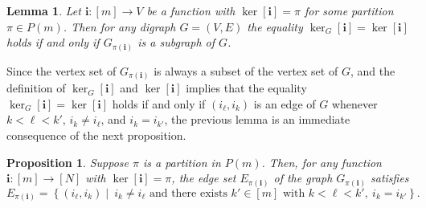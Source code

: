 \documentclass[a4paper,12pt]{extarticle}
\newtheorem{lem}[thm]{Lemma}
\newtheorem{prop}[thm]{Proposition}
\theoremstyle{definition}
\theoremstyle{remark}
\begin{document}
\begin{lem}
 \label{kertopi}
Let $\bm{i}:[m] \to V$ be a function with $\ker[\bm{i}] = \pi$ for some partition $\pi \in P(m)$. 
%
Then for any digraph $G=(V,E)$ the equality $\ker_G[\bm{i}]=\ker[\bm{i}]$ holds if and only if $G_{\pi(\bm{i})}$ is a subgraph of $G$. 
%
\end{lem}


Since the vertex set of $G_{\pi(\bm{i})}$ is always a subset of the vertex set of $G$, and the definition of  $\ker_G[\bm{i}]$ and $\ker[\bm{i}]$ implies that the equality $\ker_G[\bm{i}]=\ker[\bm{i}]$ holds if and only if $(i_\ell,i_k)$ is an edge of $G$ whenever $k < \ell < k'$, $i_k \neq i_\ell$, and $i_k = i_{k'}$, the previous lemma is an immediate consequence of the next proposition. 


\begin{prop}\label{prop_evaluation_nest_cross}
%
Suppose $\pi$ is a partition in $P(m)$.
%
Then, for any function $\bm{i}: [m] \to [N]$ with $\ker[\bm{i}] = \pi$, the edge set $E_{\pi(\bm{i})}$ of the graph $G_{\pi({\bm i})}$ satisfies
%
\[ E_{\pi(\bm{i})} = \left\{ (i_\ell,i_k)  \mid  \ i_k \neq i_\ell \text{ and there exists } k' \in [m] \text{ with }k < \ell < k', \ i_k = i_{k'} 	\right\}. \]
\end{prop}
\end{document}
